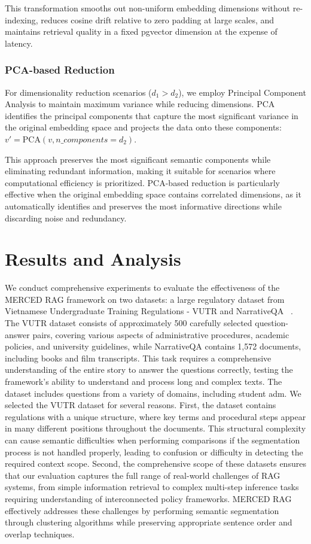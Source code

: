 \documentclass[10pt,twocolumn,letterpaper]{article}
\begin{document}
This transformation smooths out non-uniform embedding dimensions without re-indexing, reduces cosine drift relative to zero padding at large scales, and maintains retrieval quality in a fixed pgvector dimension at the expense of latency.

\subsubsection{PCA-based Reduction}

For dimensionality reduction scenarios ($d_1 > d_2$), we employ Principal Component Analysis to maintain maximum variance while reducing dimensions. PCA identifies the principal components that capture the most significant variance in the original embedding space and projects the data onto these components: $v' = \text{PCA}(v, n\_components=d_2)$.

This approach preserves the most significant semantic components while eliminating redundant information, making it suitable for scenarios where computational efficiency is prioritized. PCA-based reduction is particularly effective when the original embedding space contains correlated dimensions, as it automatically identifies and preserves the most informative directions while discarding noise and redundancy. 


\section{Results and Analysis}

We conduct comprehensive experiments to evaluate the effectiveness of the MERCED RAG framework on two datasets: a large regulatory dataset from Vietnamese Undergraduate Training Regulations - VUTR and NarrativeQA ~\cite{kocisky2017narrativeqa}. The VUTR dataset consists of approximately 500 carefully selected question-answer pairs, covering various aspects of administrative procedures, academic policies, and university guidelines, while NarrativeQA contains 1,572 documents, including books and film transcripts. This task requires a comprehensive understanding of the entire story to answer the questions correctly, testing the framework's ability to understand and process long and complex texts. The dataset includes questions from a variety of domains, including student adm. We selected the VUTR dataset for several reasons. First, the dataset contains regulations with a unique structure, where key terms and procedural steps appear in many different positions throughout the documents. This structural complexity can cause semantic difficulties when performing comparisons if the segmentation process is not handled properly, leading to confusion or difficulty in detecting the required context scope. Second, the comprehensive scope of these datasets ensures that our evaluation captures the full range of real-world challenges of RAG systems, from simple information retrieval to complex multi-step inference tasks requiring understanding of interconnected policy frameworks. MERCED RAG effectively addresses these challenges by performing semantic segmentation through clustering algorithms while preserving appropriate sentence order and overlap techniques.
\end{document}
